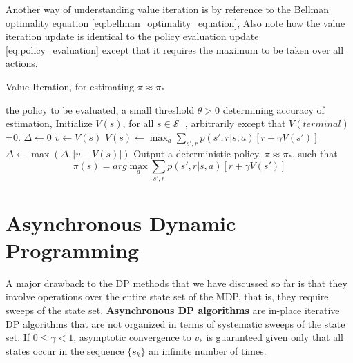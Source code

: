 Another way of understanding value iteration is by reference to the Bellman optimality
equation \ref{eq:bellman_optimality_equation}, Also note how the value iteration update is
identical to the policy evaluation update \ref{eq:policy_evaluation} except that it requires the maximum to be
taken over all actions.

\begin{algorithm}[H]
\label{alg:iterative_value_iteration}
\caption{Value Iteration, for estimating $\pi \approx \pi_*$}
\begin{algorithmic}[1]
\Require the policy to be evaluated, a small threshold $\theta > 0$ determining accuracy of estimation, Initialize $V(s)$, for all $s \in \mathcal{S}^+$, arbitrarily except that $V(terminal)$=0.
\Statex
\Repeat
	\State \begin{math}\Delta \leftarrow 0\end{math}
		\State \begin{math}v \leftarrow V(s)\end{math}
		\State \begin{math}V(s) \leftarrow \max_a \sum_{s',r}p(s', r|s, a)[r+\gamma V(s')]\end{math}
		\State \begin{math}\Delta \leftarrow \max(\Delta , |v-V(s)|)\end{math}
	\EndFor
\Until{\begin{math} \Delta < \theta \end{math}}
\Statex
\State Output a deterministic policy, $\pi \approx \pi_*$, such that
$$\pi(s)=arg \max_a \sum_{s',r}p(s',r|s, a)[r+\gamma V(s')]$$
\end{algorithmic}
\end{algorithm}

\section{Asynchronous Dynamic Programming}
A major drawback to the DP methods that we have discussed so far is that they involve
operations over the entire state set of the MDP, that is, they require sweeps of the state
set. \textbf{Asynchronous DP algorithms} are in-place iterative DP algorithms that are not organized
in terms of systematic sweeps of the state set. If $0 \leq \gamma < 1$, asymptotic convergence to $v_*$ is guaranteed given only that all states occur in the sequence $\{s_k\}$ an infinite number of  times.

